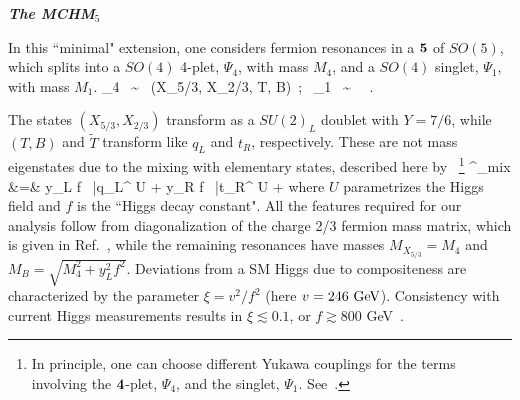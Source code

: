 \medskip
\noindent
\textit{\small \bf The MCHM$_5$}
\medskip

In this ``minimal" extension, one considers fermion resonances in a 
${\bf 5}$ of $SO(5)$, which splits into a $SO(4)$ 4-plet,
$\Psi_4$, with mass $M_4$, and a $SO(4)$ singlet, $\Psi_1$, with mass $M_1$.
%
\be
\Psi_4 ~\sim~ (X_{5/3}, X_{2/3}, T, B)~;~   \Psi_1 ~\sim~ ~.
\label{comp5content}
\ee
%

 The states $(X_{5/3}, X_{2/3})$ transform as a $SU(2)_L$ doublet with $Y = 7/6$, while $(T, B)$ and $\tilde{T}$ transform like $q_L$ and $t_R$, respectively. These are not mass eigenstates due to the mixing with elementary states, described here by ~\footnote{In principle, one can
choose different Yukawa couplings for the terms involving the ${\bf 4}$-plet, $\Psi_4$, and the singlet, $\Psi_1$.
See~\cite{MCHMtthh}.}
%
%
%
\bea
{}^{}_{\rm mix} &=&
y_L f \, \bar{q}_L^{} U  
+ y_R f \, \bar{t}_R^{} U  + 
\label{Lmix5}
\eea
%
where $U$ parametrizes the Higgs field and $f$ is the ``Higgs decay
constant".  All the features required for our analysis follow from diagonalization of the charge 2/3 fermion mass matrix, which is given in Ref.~\cite{MCHMtthh}, while the
 remaining resonances have masses $M_{X_{5/3}} = M_4$ and $M_B =
\sqrt{M_4^2 + y_{L}^2 f^2}$. Deviations from a SM Higgs due to compositeness are characterized by the parameter $\xi = v^2/f^2$ (here $v = 246~{\rm GeV}$). Consistency with current
Higgs measurements results in $\xi\lesssim 0.1$, or $f \gtrsim 800$
GeV~\cite{Falkowski:2013dza, Carena:2014ria, Buchalla:2014eca,
Sanz:2017tco, Liu:2017dsz, Banerjee:2017wmg, deBlas:2018tjm}.  

